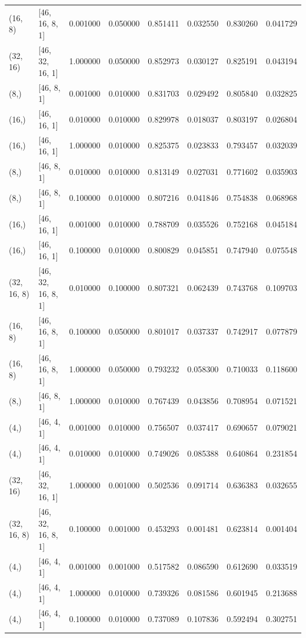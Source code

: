 \documentclass{article}
\begin{document}
\begin{longtable}{llrrrrrr}
(16, 8) & [46, 16, 8, 1] & 0.001000 & 0.050000 & 0.851411 & 0.032550 & 0.830260 & 0.041729 \\
(32, 16) & [46, 32, 16, 1] & 1.000000 & 0.050000 & 0.852973 & 0.030127 & 0.825191 & 0.043194 \\
(8,) & [46, 8, 1] & 0.001000 & 0.010000 & 0.831703 & 0.029492 & 0.805840 & 0.032825 \\
(16,) & [46, 16, 1] & 0.010000 & 0.010000 & 0.829978 & 0.018037 & 0.803197 & 0.026804 \\
(16,) & [46, 16, 1] & 1.000000 & 0.010000 & 0.825375 & 0.023833 & 0.793457 & 0.032039 \\
(8,) & [46, 8, 1] & 0.010000 & 0.010000 & 0.813149 & 0.027031 & 0.771602 & 0.035903 \\
(8,) & [46, 8, 1] & 0.100000 & 0.010000 & 0.807216 & 0.041846 & 0.754838 & 0.068968 \\
(16,) & [46, 16, 1] & 0.001000 & 0.010000 & 0.788709 & 0.035526 & 0.752168 & 0.045184 \\
(16,) & [46, 16, 1] & 0.100000 & 0.010000 & 0.800829 & 0.045851 & 0.747940 & 0.075548 \\
(32, 16, 8) & [46, 32, 16, 8, 1] & 0.010000 & 0.100000 & 0.807321 & 0.062439 & 0.743768 & 0.109703 \\
(16, 8) & [46, 16, 8, 1] & 0.100000 & 0.050000 & 0.801017 & 0.037337 & 0.742917 & 0.077879 \\
(16, 8) & [46, 16, 8, 1] & 1.000000 & 0.050000 & 0.793232 & 0.058300 & 0.710033 & 0.118600 \\
(8,) & [46, 8, 1] & 1.000000 & 0.010000 & 0.767439 & 0.043856 & 0.708954 & 0.071521 \\
(4,) & [46, 4, 1] & 0.001000 & 0.010000 & 0.756507 & 0.037417 & 0.690657 & 0.079021 \\
(4,) & [46, 4, 1] & 0.010000 & 0.010000 & 0.749026 & 0.085388 & 0.640864 & 0.231854 \\
(32, 16) & [46, 32, 16, 1] & 1.000000 & 0.001000 & 0.502536 & 0.091714 & 0.636383 & 0.032655 \\
(32, 16, 8) & [46, 32, 16, 8, 1] & 0.100000 & 0.001000 & 0.453293 & 0.001481 & 0.623814 & 0.001404 \\
(4,) & [46, 4, 1] & 0.001000 & 0.001000 & 0.517582 & 0.086590 & 0.612690 & 0.033519 \\
(4,) & [46, 4, 1] & 1.000000 & 0.010000 & 0.739326 & 0.081586 & 0.601945 & 0.213688 \\
(4,) & [46, 4, 1] & 0.100000 & 0.010000 & 0.737089 & 0.107836 & 0.592494 & 0.302751 \\

\end{longtable}
\end{document}

